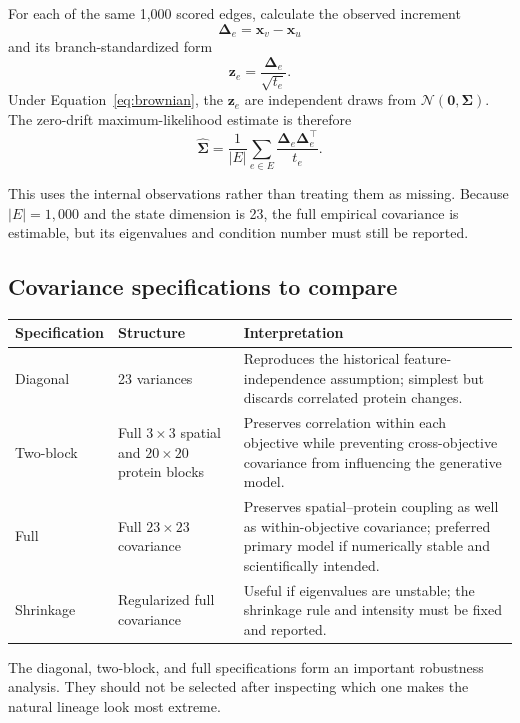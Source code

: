 \documentclass[10pt]{article}
\newcommand{\Normal}{\mathcal{N}}
\begin{document}
For each of the same 1,000 scored edges, calculate the observed increment
\[
  \boldsymbol\Delta_e = \mathbf{x}_v-\mathbf{x}_u
\]
and its branch-standardized form
\[
  \mathbf{z}_e = \frac{\boldsymbol\Delta_e}{\sqrt{t_e}}.
\]
Under Equation~\eqref{eq:brownian}, the $\mathbf{z}_e$ are independent draws
from $\Normal(\mathbf{0},\boldsymbol\Sigma)$.  The zero-drift maximum-likelihood
estimate is therefore
\begin{equation}
  \widehat{\boldsymbol\Sigma}
    = \frac{1}{|E|}\sum_{e\in E}
      \frac{\boldsymbol\Delta_e\boldsymbol\Delta_e^\top}{t_e}.
  \label{eq:sigmahat}
\end{equation}

This uses the internal observations rather than treating them as missing.
Because $|E|=1{,}000$ and the state dimension is 23, the full empirical
covariance is estimable, but its eigenvalues and condition number must still be
reported.

\subsection{Covariance specifications to compare}

\begin{center}
\begin{tabular}{L{28mm}L{50mm}L{72mm}}
\toprule
Specification & Structure & Interpretation \\
\midrule
Diagonal & 23 variances & Reproduces the historical feature-independence
assumption; simplest but discards correlated protein changes. \\
Two-block & Full $3\times3$ spatial and $20\times20$ protein blocks & Preserves
correlation within each objective while preventing cross-objective covariance
from influencing the generative model. \\
Full & Full $23\times23$ covariance & Preserves spatial--protein coupling as
well as within-objective covariance; preferred primary model if numerically
stable and scientifically intended. \\
Shrinkage & Regularized full covariance & Useful if eigenvalues are unstable;
the shrinkage rule and intensity must be fixed and reported. \\
\bottomrule
\end{tabular}
\end{center}

The diagonal, two-block, and full specifications form an important robustness
analysis.  They should not be selected after inspecting which one makes the
natural lineage look most extreme.
\end{document}
